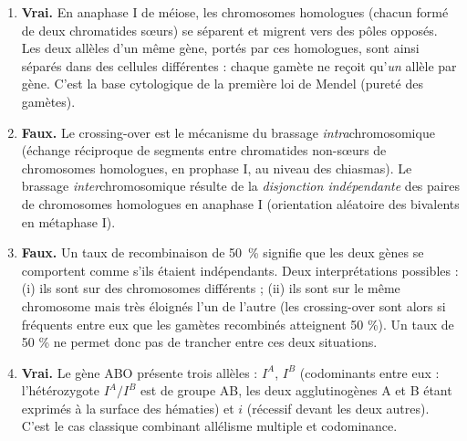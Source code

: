 \documentclass[11pt]{article}
\begin{document}
\begin{corrige}
\begin{enumerate}
    \item \textbf{Vrai.} En anaphase I de méiose, les chromosomes homologues (chacun formé de deux chromatides sœurs) se séparent et migrent vers des pôles opposés. Les deux allèles d'un même gène, portés par ces homologues, sont ainsi séparés dans des cellules différentes : chaque gamète ne reçoit qu'\emph{un} allèle par gène. C'est la base cytologique de la première loi de Mendel (pureté des gamètes).
    \item \textbf{Faux.} Le crossing-over est le mécanisme du brassage \emph{intra}chromosomique (échange réciproque de segments entre chromatides non-sœurs de chromosomes homologues, en prophase I, au niveau des chiasmas). Le brassage \emph{inter}chromosomique résulte de la \emph{disjonction indépendante} des paires de chromosomes homologues en anaphase I (orientation aléatoire des bivalents en métaphase I).
    \item \textbf{Faux.} Un taux de recombinaison de \SI{50}{\percent} signifie que les deux gènes se comportent comme s'ils étaient indépendants. Deux interprétations possibles : (i) ils sont sur des chromosomes différents ; (ii) ils sont sur le même chromosome mais très éloignés l'un de l'autre (les crossing-over sont alors si fréquents entre eux que les gamètes recombinés atteignent 50 \%). Un taux de 50 \% ne permet donc pas de trancher entre ces deux situations.
    \item \textbf{Vrai.} Le gène ABO présente trois allèles : $I^A$, $I^B$ (codominants entre eux : l'hétérozygote $I^A/I^B$ est de groupe AB, les deux agglutinogènes A et B étant exprimés à la surface des hématies) et $i$ (récessif devant les deux autres). C'est le cas classique combinant allélisme multiple et codominance.
\end{enumerate}
\end{corrige}
\end{document}
